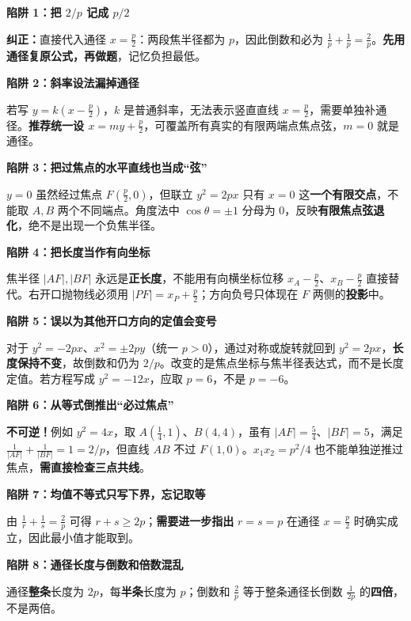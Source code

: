 \clearpage
\begin{trapbox}
\textbf{\textcolor{CTrap}{陷阱 1：把 $2/p$ 记成 $p/2$}}

\textbf{纠正：}直接代入通径 $x=\frac p2$：两段焦半径都为 $p$，因此倒数和必为 $\frac1p+\frac1p=\frac2p$。\textbf{先用通径复原公式，再做题}，记忆负担最低。

\medskip
\textbf{\textcolor{CTrap}{陷阱 2：斜率设法漏掉通径}}

若写 $y=k(x-\frac p2)$，$k$ 是普通斜率，无法表示竖直直线 $x=\frac p2$，需要单独补通径。\textbf{推荐统一设 $x=my+\frac p2$}，可覆盖所有真实的有限两端点焦点弦，$m=0$ 就是通径。

\medskip
\textbf{\textcolor{CTrap}{陷阱 3：把过焦点的水平直线也当成“弦”}}

$y=0$ 虽然经过焦点 $F(\frac p2,0)$，但联立 $y^2=2px$ 只有 $x=0$ 这\textbf{一个有限交点}，不能取 $A,B$ 两个不同端点。角度法中 $\cos\theta=\pm1$ 分母为 $0$，反映\textbf{有限焦点弦退化}，绝不是出现一个负焦半径。

\medskip
\textbf{\textcolor{CTrap}{陷阱 4：把长度当作有向坐标}}

焦半径 $|AF|,|BF|$ 永远是\textbf{正长度}，不能用有向横坐标位移 $x_A-\frac p2$、$x_B-\frac p2$ 直接替代。右开口抛物线必须用 $|PF|=x_P+\frac p2$；方向负号只体现在 $F$ 两侧的\textbf{投影}中。

\medskip
\textbf{\textcolor{CTrap}{陷阱 5：误以为其他开口方向的定值会变号}}

对于 $y^2=-2px$、$x^2=\pm2py$（统一 $p>0$），通过对称或旋转就回到 $y^2=2px$，\textbf{长度保持不变}，故倒数和仍为 $2/p$。改变的是焦点坐标与焦半径表达式，而不是长度定值。若方程写成 $y^2=-12x$，应取 $p=6$，不是 $p=-6$。

\medskip
\textbf{\textcolor{CTrap}{陷阱 6：从等式倒推出“必过焦点”}}

\textbf{不可逆！}例如 $y^2=4x$，取 $A(\frac14,1)$、$B(4,4)$，虽有 $|AF|=\frac54$、$|BF|=5$，满足 $\frac1{|AF|}+\frac1{|BF|}=1=2/p$，但直线 $AB$ 不过 $F(1,0)$。$x_1x_2=p^2/4$ 也不能单独逆推过焦点，\textbf{需直接检查三点共线}。

\medskip
\textbf{\textcolor{CTrap}{陷阱 7：均值不等式只写下界，忘记取等}}

由 $\frac1r+\frac1s=\frac2p$ 可得 $r+s\ge2p$；\textbf{需要进一步指出} $r=s=p$ 在通径 $x=\frac p2$ 时确实成立，因此最小值才能取到。

\medskip
\textbf{\textcolor{CTrap}{陷阱 8：通径长度与倒数和倍数混乱}}

通径\textbf{整条}长度为 $2p$，每\textbf{半条}长度为 $p$；倒数和 $\frac2p$ 等于整条通径长倒数 $\frac1{2p}$ 的\textbf{四倍}，不是两倍。
\end{trapbox}
